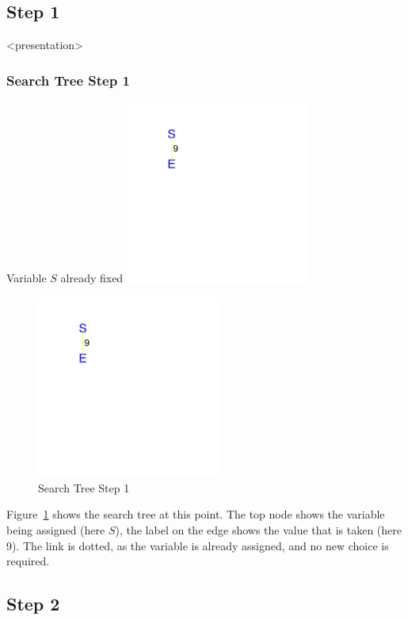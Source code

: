 \subsection{Step 1}

\begin{frame}<presentation>
\frametitle{Search Tree Step 1}
Variable $S$ already fixed
\includegraphics[width=6cm]{../sendmore/FULL/tree_expanded_2}
\end{frame}

\begin{figure}[ht]
\caption{\label{sendmore:Step 1}Search Tree Step 1}
\begin{center}
\includegraphics[width=6cm]{../sendmore/FULL/tree_expanded_2}
\end{center}
\end{figure}

Figure~\ref{sendmore:Step 1} shows the search tree at this point. The top node shows the variable being assigned (here $S$), the label on the edge shows the value that is taken (here 9). The link is dotted, as the variable is already assigned, and no new choice is required.

\subsection{Step 2}

